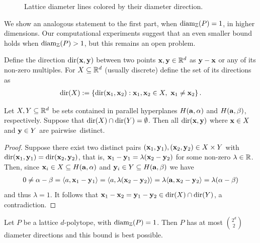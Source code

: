 \begin{figure}[ht!]
  \centering
  
  \caption{Lattice diameter lines colored by their diameter direction.}
  \label{fig:diam-dir}
\end{figure}


We show an analogous statement to the first part, when $\operatorname{diam_{\mathbb{Z}}}(P)=1$, in higher dimensions. Our computational experiments suggest that an even smaller bound holds when $\operatorname{diam_{\mathbb{Z}}}(P)>1$, but this remains an open problem.

Define the direction $\operatorname{dir}(\mathbf{x},\mathbf{y})$ between two points $\mathbf{x},\mathbf{y} \in \mathbb{R}^d$ as $\mathbf{y}-\mathbf{x}$ or any of its non-zero multiples. For $X \subseteq \mathbb{R}^d$ (usually discrete) define the set of its directions as
\begin{align*}
    \operatorname{dir}(X):= \left\{ \operatorname{dir}(\mathbf{x}_1,\mathbf{x}_2): \mathbf{x}_1,\mathbf{x}_2 \in X, \ \mathbf{x}_1 \neq \mathbf{x}_2  \right\}.
\end{align*}

\begin{lemma}\label{lemma:hyp-dir}
    Let $X,Y \subseteq \mathbb{R}^d$ be sets contained in parallel hyperplanes $H(\mathbf{a},\alpha)$ and $ H(\mathbf{a},\beta)$, respectively. Suppose that $\operatorname{dir}(X) \cap \operatorname{dir}(Y) = \emptyset$. Then all $\operatorname{dir}(\mathbf{x},\mathbf{y})$ where $\mathbf{x} \in X$ and $\mathbf{y} \in Y$ are \mbox{pairwise distinct}. 
\end{lemma}

\begin{proof}
    Suppose there exist two distinct pairs $(\mathbf{x}_1,\mathbf{y}_1), (\mathbf{x}_2,\mathbf{y}_2) \in X \times Y$ with $\operatorname{dir}(\mathbf{x}_1,\mathbf{y}_1)=\operatorname{dir}(\mathbf{x}_2,\mathbf{y}_2)$, that is, $\mathbf{x}_1-\mathbf{y}_1=\lambda(\mathbf{x}_2-\mathbf{y}_2)$ for some non-zero $\lambda \in \mathbb{R}$. Then, since $\mathbf{x}_i \in X \subseteq H(\mathbf{a},\alpha)$ and $\mathbf{y}_i \in Y \subseteq H(\mathbf{a},\beta)$ we have
    \begin{align*}
        0 \neq \alpha - \beta = \langle a, \mathbf{x}_1 - \mathbf{y}_1 \rangle = \langle a, \lambda(\mathbf{x}_2 - \mathbf{y}_2) \rangle 
        = \lambda \langle \mathbf{a}, \mathbf{x}_2 - 
        \mathbf{y}_2 \rangle 
        =\lambda (\alpha - \beta)
    \end{align*}
    and thus $\lambda =1$. It follows that $\mathbf{x}_1-\mathbf{x}_2 =\mathbf{y}_1-\mathbf{y}_2 \in \operatorname{dir}(X) \cap \operatorname{dir}(Y)$, a contradiction.
\end{proof}

\begin{theorem}\label{thm:diam-dir}
    Let $P$ be a lattice $d$-polytope, with $\operatorname{diam_{\mathbb{Z}}}(P)=1$. Then $P$ has at most $\binom{2^d}{2}$ diameter directions and this bound is best possible.
\end{theorem}

